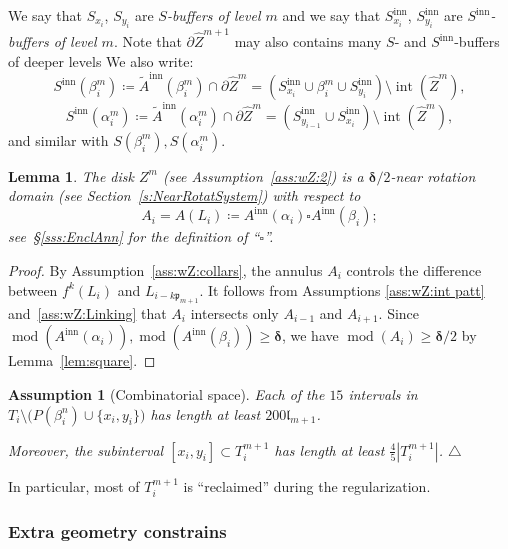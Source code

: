 \documentclass{amsart}
\newcommand\xqed[1]{%
  \leavevmode\unskip\penalty9999 \hbox{}\nobreak\hfill
  \quad\hbox{#1}}
\newcommand\tqed{\xqed{$\triangle$}}
\newcommand{\1}{{\mathbb 1 }}
\newcommand\intr{\operatorname{int}}
\newcommand{\wZ}{{\widehat Z}}
\newcommand{\pp}{\mathfrak{p}}
\newcommand{\length}{{\mathfrak l}}
\newcommand\inn{{\operatorname{inn}}}
\newtheorem{assum}{Assumption}
\newtheorem{lem}[thm]{Lemma}
\theoremstyle{remark}
\numberwithin{equation}{section}
\theoremstyle{definition}
\renewcommand{\mod}{\operatorname{mod}}
\newcommand{\bdelta}{{\boldsymbol{ \delta}}}
\begin{document}
We say that $S_{x_i}$, $S_{y_i}$ are \emph{$S$-buffers of level $m$} and we say that $S^\inn_{x_i}$, $S^\inn_{y_i}$ are \emph{$S^\inn$-buffers of level $m$}. Note that $\partial \widehat Z^{m+1}$ may also contains many $S$- and $S^\inn$-buffers of deeper levels We also write:
\begin{equation}
\label{eq:dfn S^inn beta}
S^\inn(\beta_i^m)\coloneqq \widetilde A^\inn (\beta^m_i)\cap \partial \wZ^{m}=\left(S^\inn_{x_{i}}\cup \beta_i^m \cup  S^\inn_{y_{i}}\right)\setminus \intr(\wZ^m), 
\end{equation}
\begin{equation}
\label{eq:dfn S^inn alpha}
S^\inn(\alpha_i^m)\coloneqq \widetilde A^\inn (\alpha^m_i)\cap \partial \wZ^{m}=\left(S^\inn_{y_{i-1}}\cup   S^\inn_{x_{i}}\right)\setminus \intr(\wZ^m), 
\end{equation}
and similar with $S(\beta_i^m), S(\alpha_i^m)$.

\begin{lem}
The disk $Z^m$ (see Assumption~\ref{ass:wZ:2}) is a $\bdelta/2$-near rotation domain (see Section~\ref{s:NearRotatSystem}) with respect to \[A_i=A (L_i)\coloneqq A^\inn(\alpha_i) \square A^\inn(\beta_i) ;\]
see~\S\ref{sss:EnclAnn} for the definition of ``$\square$''.
\end{lem}
\begin{proof}
By Assumption~\ref{ass:wZ:collars}, the annulus $A_i$ controls the difference between $f^k(L_i)$ and $L_{i-k\pp_{m+1}}.$ It follows from Assumptions \ref{ass:wZ:int patt} and~\ref{ass:wZ:Linking} that $A_i$ intersects only $A_{i-1}$ and $A_{i+1}$. Since $\mod (A^\inn(\alpha_i)), \mod (A^\inn(\beta_i))\ge \bdelta$, we have $\mod(A_i)\ge \bdelta/2$ by Lemma~\ref{lem:square}.
\end{proof}



\begin{assum}[Combinatorial space]
\label{ass:wZ:CombSpace}
Each of the $15$ intervals in $T_i\setminus \big(P(\beta^n_i)\cup \{x_i, y_i\}\big)$ 
has length at least $200 \length_{m+1}$.

 Moreover, the subinterval $[x_i,y_i]\subset T^{m+1}_i$ has length at least $\frac 4 5  |T^{m+1}_i|$.
 \tqed
\end{assum}

In particular, most of $T^{m+1}_i$ is ``reclaimed'' during the regularization.





\subsubsection{Extra geometry constrains}
\label{sss:Geom in Fjor}
\end{document}
